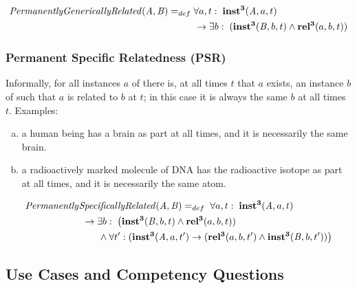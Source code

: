 \begin{equation}
\begin{split}
\mathit{PermanentlyGenericallyRelated}(\mathit{A},\mathit{B}) =_{def}&\;
\forall a, t:\; \mathrm{\mathbf{inst^3}}(\mathit{A}, a, t) \\
&\ \rightarrow
\exists b:\;(\mathrm{\mathbf{inst^3}}(\mathit{B},b,t) \wedge
\mathrm{\mathbf{rel^3}}(a,b,t))
\end{split}
\label{eq:generically:cls}
\end{equation}


\subsubsection*{Permanent Specific Relatedness (PSR)}

Informally, for all instances $a$ of  there is, at all times $t$ that $a$ exists, an
instance $b$ of  such that $a$ is related to $b$ at $t$; in this case it is always the
same $b$ at all times $t$. Examples:
\begin{enumerate}[(a)]
\item a human being has a brain as part at all times, and it is necessarily the same brain.
\item a radioactively marked molecule of DNA has the radioactive isotope as part
at all times, and it is necessarily the same atom.
\end{enumerate}

\begin{equation}
\begin{split}
\mathit{Permanently}&\mathit{SpecificallyRelated}(\mathit{A},\mathit{B}) =_{def}\;
\forall a, t:\; \mathrm{\mathbf{inst^3}}(\mathit{A}, a, t) \\
&\ \rightarrow
\exists b:\;\big(\mathrm{\mathbf{inst^3}}(\mathit{B},b,t) \wedge
\mathrm{\mathbf{rel^3}}(a,b,t))
\\
&\quad\quad \wedge \forall t^\prime: (\mathrm{\mathbf{inst^3}}(\mathit{A},a,t^\prime)
\rightarrow (\mathrm{\mathbf{rel^3}}(a,b,t^\prime) \wedge
\mathrm{\mathbf{inst^3}}(\mathit{B},b,t^\prime))\big)
\end{split}
\label{eq:specifically:cls}
\end{equation}


\subsection*{Use Cases and Competency Questions}



